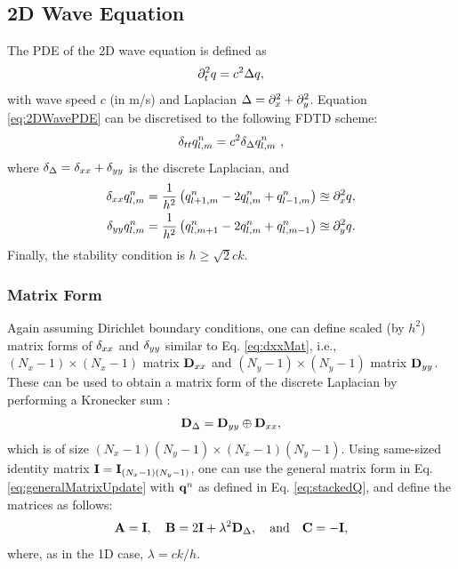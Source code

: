 \documentclass[fleqn]{jaes}
\begin{document}
\subsection{2D Wave Equation}
The PDE of the 2D wave equation is defined as
\begin{equation}\label{eq:2DWavePDE}
    \ptt q = c^2 \Delta q,
\end{equation}
with wave speed $c$ (in m/s) and Laplacian $\Delta = \partial_x^2 + \partial_y^2$. Equation \eqref{eq:2DWavePDE} can be discretised to the following FDTD scheme:
\begin{equation}\label{eq:2DWaveFDS}
    \dtt \qlmn = c^2 \dDelta \qlmn\ ,
\end{equation}
where $\delta_{\Delta} = \delta_{xx} + \delta_{yy}$ is the discrete Laplacian, and 
\begin{subequations}
\begin{align}
    \delta_{xx} q_{l,m}^n &= \frac{1}{h^2}\left(q_{l+1,m}^n - 2 q_{l,m}^n + q_{l-1,m}^n\right)\approxeq \partial_x^2 q,\\
    \delta_{yy} q_{l,m}^n &= \frac{1}{h^2}\left(q_{l,m+1}^n - 2 q_{l,m}^n + q_{l,m-1}^n\right)\approxeq \partial_y^2 q.
\end{align}
\end{subequations}
Finally, the stability condition is $h \geq \sqrt{2}c k$.

\subsubsection{Matrix Form}
Again assuming Dirichlet boundary conditions, one can define scaled (by $h^2$) matrix forms of $\delta_{xx}$ and $\delta_{yy}$ similar to Eq. \eqref{eq:dxxMat}, i.e., $(N_x-1)\times(N_x-1)$ matrix $\mathbf{D}_{xx}$ and $(N_y-1)\times(N_y-1)$ matrix $\mathbf{D}_{yy}$. These can be used to obtain a matrix form of the discrete Laplacian by performing a Kronecker sum \cite{Horn1991, Hamilton2016}:
\begin{equation}\label{eq:kroneckerSum}
    \DDeltamat = \Dyy \oplus \Dxx,
\end{equation}
which is of size $(N_x-1)(N_y-1)\times (N_x-1)(N_y-1)$.
%
Using same-sized identity matrix $\mathbf{I} = \mathbf{I}_{(N_x-1)(N_y-1)}$, one can use the general matrix form in Eq. \eqref{eq:generalMatrixUpdate} with $\mathbf{q}^n$ as defined in Eq. \eqref{eq:stackedQ}, and define the matrices as follows:
\begin{equation}
    \A = \I, \quad \B = 2\I + \lambda^2 \DDeltamat, \qaq \C = -\I,
\end{equation}
where, as in the 1D case, $\lambda = c k /h$.
\end{document}
